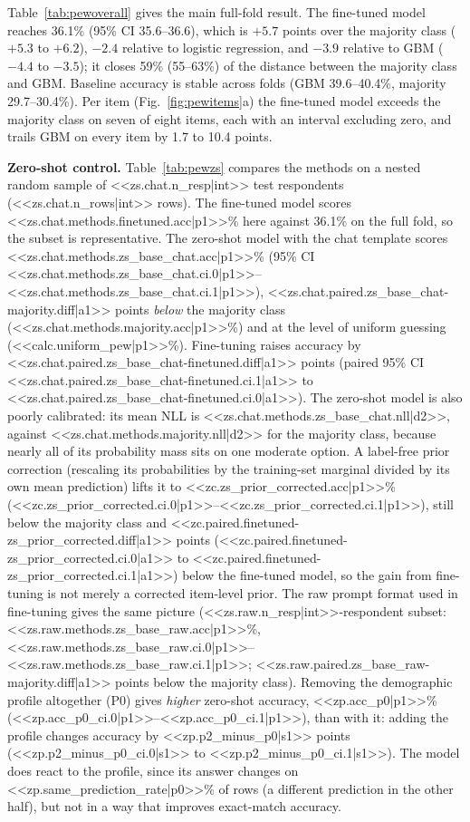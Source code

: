 \documentclass[conference]{IEEEtran}
\begin{document}
Table~\ref{tab:pewoverall} gives the main full-fold result. The fine-tuned model reaches 36.1\% (95\% CI 35.6--36.6), which is $+5.7$ points over the majority class ($+5.3$ to $+6.2$), $-2.4$ relative to logistic regression, and $-3.9$ relative to GBM ($-4.4$ to $-3.5$); it closes 59\% (55--63\%) of the distance between the majority class and GBM. Baseline accuracy is stable across folds (GBM 39.6--40.4\%, majority 29.7--30.4\%). Per item (Fig.~\ref{fig:pewitems}a) the fine-tuned model exceeds the majority class on seven of eight items, each with an interval excluding zero, and trails GBM on every item by 1.7 to 10.4 points.

\textbf{Zero-shot control.} Table~\ref{tab:pewzs} compares the methods on a nested random sample of <<zs.chat.n_resp|int>> test respondents (<<zs.chat.n_rows|int>> rows). The fine-tuned model scores <<zs.chat.methods.finetuned.acc|p1>>\% here against 36.1\% on the full fold, so the subset is representative. The zero-shot model with the chat template scores <<zs.chat.methods.zs_base_chat.acc|p1>>\% (95\% CI <<zs.chat.methods.zs_base_chat.ci.0|p1>>--<<zs.chat.methods.zs_base_chat.ci.1|p1>>), <<zs.chat.paired.zs_base_chat-majority.diff|a1>> points \emph{below} the majority class (<<zs.chat.methods.majority.acc|p1>>\%) and at the level of uniform guessing (<<calc.uniform_pew|p1>>\%). Fine-tuning raises accuracy by <<zs.chat.paired.zs_base_chat-finetuned.diff|a1>> points (paired 95\% CI <<zs.chat.paired.zs_base_chat-finetuned.ci.1|a1>> to <<zs.chat.paired.zs_base_chat-finetuned.ci.0|a1>>). The zero-shot model is also poorly calibrated: its mean NLL is <<zs.chat.methods.zs_base_chat.nll|d2>>, against <<zs.chat.methods.majority.nll|d2>> for the majority class, because nearly all of its probability mass sits on one moderate option. A label-free prior correction (rescaling its probabilities by the training-set marginal divided by its own mean prediction) lifts it to <<zc.zs_prior_corrected.acc|p1>>\% (<<zc.zs_prior_corrected.ci.0|p1>>--<<zc.zs_prior_corrected.ci.1|p1>>), still below the majority class and <<zc.paired.finetuned-zs_prior_corrected.diff|a1>> points (<<zc.paired.finetuned-zs_prior_corrected.ci.0|a1>> to <<zc.paired.finetuned-zs_prior_corrected.ci.1|a1>>) below the fine-tuned model, so the gain from fine-tuning is not merely a corrected item-level prior. The raw prompt format used in fine-tuning gives the same picture (<<zs.raw.n_resp|int>>-respondent subset: <<zs.raw.methods.zs_base_raw.acc|p1>>\%, <<zs.raw.methods.zs_base_raw.ci.0|p1>>--<<zs.raw.methods.zs_base_raw.ci.1|p1>>; <<zs.raw.paired.zs_base_raw-majority.diff|a1>> points below the majority class). Removing the demographic profile altogether (P0) gives \emph{higher} zero-shot accuracy, <<zp.acc_p0|p1>>\% (<<zp.acc_p0_ci.0|p1>>--<<zp.acc_p0_ci.1|p1>>), than with it: adding the profile changes accuracy by <<zp.p2_minus_p0|s1>> points (<<zp.p2_minus_p0_ci.0|s1>> to <<zp.p2_minus_p0_ci.1|s1>>). The model does react to the profile, since its answer changes on <<zp.same_prediction_rate|p0>>\% of rows (a different prediction in the other half), but not in a way that improves exact-match accuracy.
\end{document}
